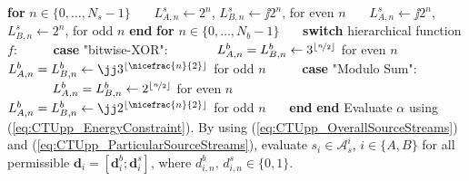  \begin{algorithmic}[1]
    \State {}  
    \State \textbf{for} $n \in \{0,\dots,N_s-1\}$  
      \State  ~~~$L_{A,n}^s \gets 2^n$,  $L_{B,n}^s\gets \jj 2^n$, for even $n$
      \label{alg_line:CTUpp_LAAssignment}
      \State  ~~~$L_{A,n}^s \gets \jj 2^n$,  $L_{B,n}^s\gets 2^n$, for odd $n$
      \label{alg_line:CTUpp_LBAssignment}
    \State \textbf{end}
    \State \textbf{for} $n \in \{0,\dots,N_b-1\}$  
    \State ~~~\textbf{switch} hierarchical function $f$:
    \State ~~~~~\textbf{case} "bitwise-XOR": 
    \State ~~~~~~~$L_{A,n}^b=L_{B,n}^b \gets 3^{\left\lfloor \nicefrac{n}{2}\right\rfloor }$ for even $n$     
    \label{alg_line:CTUpp_LAXORAssignment}
    \State ~~~~~~~$L_{A,n}^b=L_{B,n}^b \gets \jj 3^{\left\lfloor \nicefrac{n}{2}\right\rfloor }$ for odd $n$ 
    \label{alg_line:CTUpp_LBXORAssignment}
    \State ~~~~~\textbf{case} "Modulo Sum":
    \State ~~~~~~~$L_{A,n}^b=L_{B,n}^b \gets 2^{\left\lfloor \nicefrac{n}{2}\right\rfloor } $ for even $n$ 
    \label{alg_line:CTUpp_LAMSAssignment}
    \State ~~~~~~~$L_{A,n}^b=L_{B,n}^b \gets \jj 2^{\left\lfloor \nicefrac{n}{2}\right\rfloor } $ for odd $n$ 
    \label{alg_line:CTUpp_LBMSAssignment}
    \State ~~~\textbf{end}
    \State \textbf{end}
    \State Evaluate $\alpha$ using (\ref{eq:CTUpp_EnergyConstraint}). 
    \State By using (\ref{eq:CTUpp_OverallSourceStreams}) and (\ref{eq:CTUpp_ParticularSourceStreams}), evaluate $s_i\in\mathcal{A}^i_s$, $i\in\{A,B\}$ for all permissible $\mathbf{d}_{i}=\left[\mathbf{d}_{i}^{b};\mathbf{d}_{i}^{s}\right]$, where $d^b_{i,n},\,d^s_{i,n}\in\{0,1\}$.
	\State {}
  \end{algorithmic}
